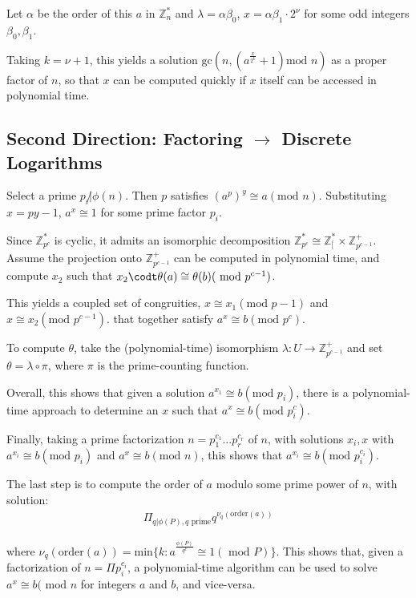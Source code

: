 \documentclass{article}
\begin{document}
 Let $\alpha$ be the order of this $a$ in $\mathbb{Z}_n^{*}$ and $\lambda=\alpha\beta_0$, $x=\alpha\beta_1\cdot 2^\nu$ for some odd integers $\beta_0,\beta_1$.
 
 Taking $k=\nu+1$, this yields a solution $\text{gc}(n,(a^\frac{x}{2^k}+1)\text{mod }n)$ as a proper factor of $n$, so that $x$ can be computed quickly if $x$ itself can be accessed in polynomial time.
 
 \subsection{Second Direction: Factoring $\rightarrow$ Discrete Logarithms}
 
Select a prime $p_i\not |\phi(n)$. Then $p$ satisfies $(a^p)^y\cong a(\text{mod }n)$. Substituting $x=py-1$, $a^x\cong 1$ for some prime factor $p_i$.

Since $\mathbb{Z}_{p^c}^*$ is cyclic, it admits an isomorphic decomposition $\mathbb{Z}_{p^c}^*\cong\mathbb{Z}_[^*\times\mathbb{Z}_{p^{c-1}}^+$. Assume the projection onto $\mathbb{Z}_{p^{c-1}}^+$ can be computed in polynomial time, and compute $x_2$ such that $x_2\codt\theta(a)\cong\theta(b)(\text{ mod }p^{c-1})$.

This yields a coupled set of congruities, $x\cong x_1(\text{mod }p-1)$ and $x\cong x_2(\text{mod }p^{c-1})$. that together satisfy $a^x\cong b(\text{mod }p^c)$.

To compute $\theta$, take the (polynomial-time) isomorphism $\lambda:U\rightarrow\mathbb{Z}_{p^{c-1}}^+$ and set $\theta=\lambda\circ\pi$, where $\pi$ is the prime-counting function.

Overall, this shows that given a solution $a^{x_1}\cong b(\text{mod }p_i)$, there is a polynomial-time approach to determine an $x$ such that $a^x\cong b(\text{mod }p_i^c)$.

Finally, taking a prime factorization $n=p_1^{c_1}...p_r^{c_r}$ of $n$, with solutions $x_i,x$ with $a^{x_i}\cong b(\text{mod }p_i)$ and $a^x\cong b(\text{mod }n)$, this shows that $a^{x_i}\cong b(\text{mod }p_i^{c_i})$.

The last step is to compute the order of $a$ modulo some prime power of $n$, with solution:
\begin{align}
    \Pi_{q|\phi(P),q\text{ prime}}q^{\nu_q(\text{order}(a))}
\end{align}

where $\nu_q(\text{order}(a))=\text{min}\{k:a^\frac{\phi(P)}{q^k}\cong 1(\text{ mod }P)\}$.
\newline\newline
This shows that, given a factorization of $n=\Pi p_i^{c_i}$, a polynomial-time algorithm can be used to solve $a^x\cong b(\text{ mod }n$ for integers $a$ and $b$, and vice-versa.
 
\end{document}
